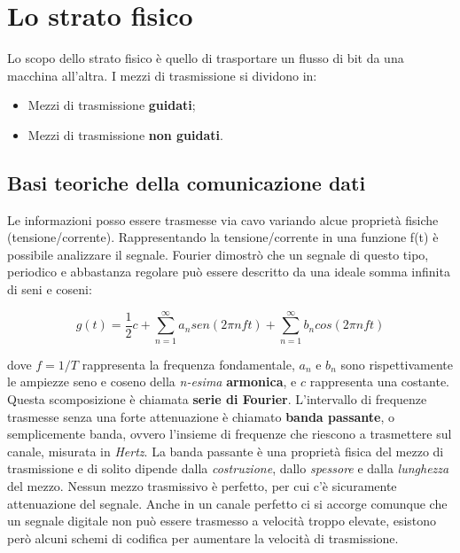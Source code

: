 \section{Lo strato fisico}

Lo scopo dello strato fisico è quello di trasportare un flusso di bit da una macchina all'altra. I mezzi di trasmissione si dividono in:

\begin{itemize}

\item Mezzi di trasmissione \textbf{guidati};
\item Mezzi di trasmissione \textbf{non guidati}.

\end{itemize}

\subsection{Basi teoriche della comunicazione dati}

Le informazioni posso essere trasmesse via cavo variando alcue proprietà fisiche (tensione/corrente). Rappresentando la tensione/corrente in una funzione f(t) è possibile analizzare il segnale. Fourier dimostrò che un segnale di questo tipo, periodico e abbastanza regolare può essere descritto da una ideale somma infinita di seni e coseni:

$$g(t)=\frac{1}{2}c+\displaystyle\sum\limits_{n=1}^\infty a_n sen(2\pi nft)+\displaystyle\sum\limits_{n=1}^\infty b_n cos(2\pi nft) $$

dove $f=1/T$ rappresenta la frequenza fondamentale, $a_n$ e $b_n$ sono rispettivamente le ampiezze seno e coseno della \textit{n-esima} \textbf{armonica}, e $c$ rappresenta una costante. Questa scomposizione è chiamata \textbf{serie di Fourier}.
\linebreak
\linebreak
L'intervallo di frequenze trasmesse senza una forte attenuazione è chiamato \textbf{banda passante}, o semplicemente banda, ovvero l'insieme di frequenze che riescono a trasmettere sul canale, misurata in \textit{Hertz}. La banda passante è una proprietà fisica del mezzo di trasmissione e di solito dipende dalla \textit{costruzione}, dallo \textit{spessore} e dalla \textit{lunghezza} del mezzo. Nessun mezzo trasmissivo è perfetto, per cui c'è sicuramente attenuazione del segnale. Anche in un canale perfetto ci si accorge comunque che un segnale digitale non può essere trasmesso a velocità troppo elevate, esistono però alcuni schemi di codifica per aumentare la velocità di trasmissione.

